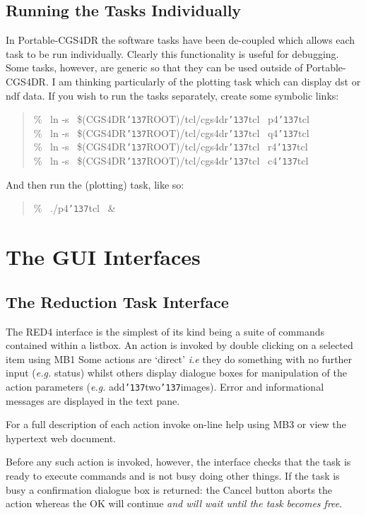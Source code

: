 \documentclass[a4paper]{book}
\newcommand{\stardocinitials}  {SUN}
\newcommand{\stardocnumber}    {27.5}
\newcommand{\stardocname}{\stardocinitials /\stardocnumber}
\renewcommand{\_}{{\tt\char'137}}
\begin{document}
\section{Running the Tasks Individually}
In Portable-CGS4DR the software tasks have been de-coupled which allows each task to be
run individually. Clearly this functionality is useful for debugging. Some tasks, however,
are generic so that they can be used outside of Portable-CGS4DR. I am thinking particularly
of the plotting task which can display {\sc dst} or {\sc ndf} data. If you wish to run the
tasks separately, create some symbolic links:

\begin{quote}
  \% \ ln -s \ \$(CGS4DR\_ROOT)/tcl/cgs4dr\_tcl \ p4\_tcl \\
  \% \ ln -s \ \$(CGS4DR\_ROOT)/tcl/cgs4dr\_tcl \ q4\_tcl \\
  \% \ ln -s \ \$(CGS4DR\_ROOT)/tcl/cgs4dr\_tcl \ r4\_tcl \\
  \% \ ln -s \ \$(CGS4DR\_ROOT)/tcl/cgs4dr\_tcl \ c4\_tcl 
\end{quote}

And then run the (plotting) task, like so:

\begin{quote}
  \% \ ./p4\_tcl \ \&
\end{quote}

\markboth{The GUI Interfaces}{\stardocname}
\chapter{The GUI Interfaces}
\section{The Reduction Task Interface}
The RED4 interface is the simplest of its kind being a suite of commands 
contained within a listbox. An action is invoked by double clicking on a selected item using MB1
Some actions are `direct' {\em i.e} they do something with no further
input ({\em e.g.} status) whilst others display dialogue boxes for manipulation of the action
parameters ({\em e.g.} add\_two\_images). Error and informational messages are displayed in the text pane.

For a full description of each action invoke on-line help using MB3 or view the hypertext web document.

Before any such action is invoked, however, the interface checks that the task is
ready to execute commands and is not busy doing other things. If the task is busy a confirmation 
dialogue box is returned: the {\sf Cancel} button aborts the action whereas the {\sf OK} will continue 
{\em and will wait until the task becomes free}.
\end{document}
